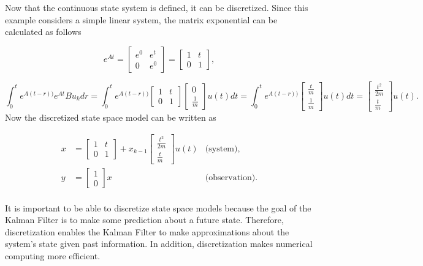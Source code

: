 \noindent Now that the continuous state system is defined, it can be discretized. Since this example considers a simple linear system, the matrix exponential can be calculated as follows 

$$e^{At} =
\begin{bmatrix}
e^0& e^t \\
0 & e^0
\end{bmatrix}=
\begin{bmatrix}
1& t\\
0 & 1
\end{bmatrix},
$$

$$\int_0^t e^{A(t-r))}  e^{At} B u_k dr=
\int_0^t e^{A(t-r))}  \begin{bmatrix}
1& t\\
0 & 1
\end{bmatrix} 
\begin{bmatrix}
0\\
\frac{1}{m}
\end{bmatrix} u(t) dt =
\int_0^t e^{A(t-r))}   \begin{bmatrix}
\frac{t}{m}\\
\frac{1}{m} 
\end{bmatrix} u(t) dt =
\begin{bmatrix}
\frac{t^2}{2m}\\
\frac{t}{m}
\end{bmatrix} u(t).
$$
Now the discretized state space model can be written as 


\begin{align*}
x &=
\begin{bmatrix}
1& t\\
0 & 1
\end{bmatrix}+x_{k-1}
\begin{bmatrix}
\frac{t^2}{2m}\\
\frac{t}{m}
\end{bmatrix} u(t) &\text{(system)}, \\
y &=
\begin{bmatrix}
1 \\
0
\end{bmatrix} x &\text{(observation)}.
\end{align*} \\

\noindent It is important to be able to discretize state space models because the goal of the Kalman Filter is to make some prediction about a future state. Therefore, discretization enables the Kalman Filter to make approximations about the system's state given past information. In addition, discretization makes numerical computing more efficient.
























